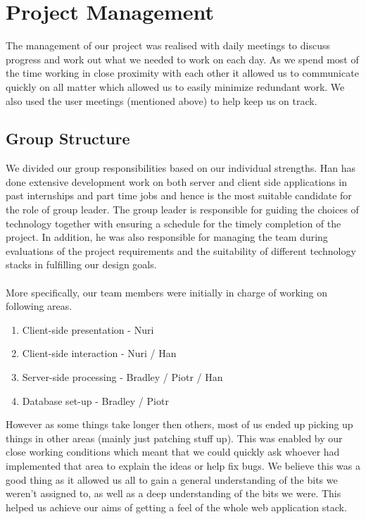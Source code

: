 \documentclass[10pt,a4paper]{article}
\begin{document}
\section{Project Management}

\noindent The management of our project was realised with daily meetings to discuss progress and work out what we needed to work on each day. As we spend most of the time working in close proximity with each other it allowed us to communicate quickly on all matter which allowed us to easily minimize redundant work. We also used the user meetings (mentioned above) to help keep us on track.

\subsection{Group Structure}
\noindent We divided our group responsibilities based on our individual strengths. Han has done extensive development work on both server and client side applications in past internships and part time jobs and hence is the most suitable candidate for the role of group leader. The group leader is responsible for guiding the choices of technology together with ensuring a schedule for the timely completion of the project. In addition, he was also responsible for managing the team during evaluations of the project requirements and the suitability of different technology stacks in fulfilling our design goals.
\\
\\
\noindent
More specifically, our team members were initially in charge of working on following areas.

\begin{enumerate}
  \item Client-side presentation - Nuri
  \item Client-side interaction - Nuri / Han
  \item Server-side processing - Bradley / Piotr / Han
  \item Database set-up - Bradley / Piotr
\end{enumerate}

\noindent However as some things take longer then others, most of us ended up picking up things in other areas (mainly just patching stuff up). This was enabled by our close working conditions which meant that we could quickly ask whoever had implemented that area to explain the ideas or help fix bugs. We believe this was a good thing as it allowed us all to gain a general understanding of the bits we weren't assigned to, as well as a deep understanding of the bits we were. This helped us achieve our aims of getting a feel of the whole web application stack.   
\end{document}
